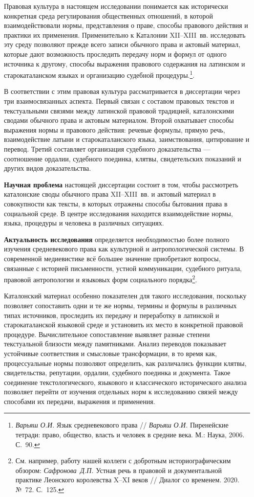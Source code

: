 Правовая культура в настоящем исследовании понимается как исторически конкретная среда регулирования общественных отношений, в которой взаимодействовали нормы, представления о праве, способы правового действия и практики их применения. Применительно к Каталонии XII--XIII~вв. исследовать эту среду позволяют прежде всего записи обычного права и актовый материал, которые дают возможность проследить передачу норм и формул от одного источника к другому, способы выражения правового содержания на латинском и старокаталанском языках и организацию судебной процедуры.\footnote{\emph{Варьяш}\emph{ О.И. }Язык средневекового права // \emph{Варьяш}\emph{ О.И. }Пиренейские тетради: право, общество, власть и человек в средние века. М.: Наука, 2006. С.~90.}.

В соответствии с этим правовая культура рассматривается в диссертации через три взаимосвязанных аспекта. Первый связан с составом правовых текстов и текстуальными связями между латинской правовой традицией, каталонскими сводами обычного права и актовым материалом. Второй охватывает способы выражения нормы и правового действия: речевые формулы, прямую речь, взаимодействие латыни и старокаталанского языка, заимствования, цитирование и перевод. Третий составляет организация судебного доказательства --- соотношение ордалии, судебного поединка, клятвы, свидетельских показаний и других видов доказательства.

\textbf{Научная проблема} настоящей диссертации состоит в том, чтобы рассмотреть каталонские своды обычного права XII--XIII~вв. и актовый материал в совокупности как тексты, в которых отражены способы бытования права в социальной среде. В центре исследования находится взаимодействие нормы, языка, процедуры и человека в различных ситуациях.

\textbf{Актуальность исследования} определяется необходимостью более полного изучения средневекового права как культурной и антропологической системы. В современной медиевистике всё большее значение приобретают вопросы, связанные с историей письменности, устной коммуникации, судебного ритуала, правовой антропологии и языковых форм социального порядка\footnote{См. например, работу нашей коллеги с добротным историографическим обзором: \emph{Сафронова}\emph{~}\emph{Д.П.} Устная речь в правовой и документальной практике Леонского королевства X--XI веков // Диалог со временем. 2020. №~72. С.~125.}.

Каталонский материал особенно показателен для такого исследования, поскольку позволяет сопоставить одни и те же нормы, термины и формулы в различных типах источников, проследить их передачу и переработку в латинской и старокаталанской языковой среде и установить их место в конкретной правовой процедуре. Вычислительное сопоставление выявляет разные степени текстуальной близости между памятниками. Анализ переводов показывает устойчивые соответствия и смысловые трансформации, в то время как, процессуальные нормы позволяют определить, как различались функции клятвы, свидетельства, репутации, ордалии, судебного поединка и документа. Такое соединение текстологического, языкового и классического исторического анализа позволяет перейти от изучения отдельных норм к исследованию связей между способами их передачи, выражения и применения.

